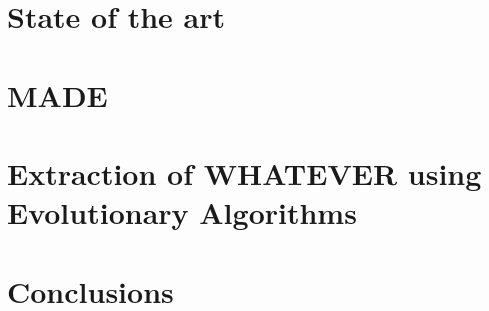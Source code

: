 \documentclass[runningheads]{llncs}
\begin{document}
\section{State of the art}
\label{sec:soa}



\section{MADE}
\label{sec:made}

\section{Extraction of WHATEVER using Evolutionary Algorithms}

\section{Conclusions}
\label{sec:conclusion}



\end{document}

